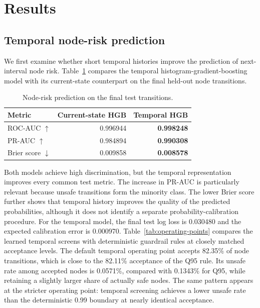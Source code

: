 \section{Results}
\label{sec:results}

\subsection{Temporal node-risk prediction}

We first examine whether short temporal histories improve the prediction
of next-interval node risk. Table~\ref{tab:model-quality} compares the
temporal histogram-gradient-boosting model with its current-state
counterpart on the final held-out node transitions.

\begin{table}[t]
\centering
\caption{Node-risk prediction on the final test transitions.}
\label{tab:model-quality}
\begin{tabular}{lrr}
\toprule
Metric &
Current-state HGB &
Temporal HGB \\
\midrule
ROC-AUC $\uparrow$ &
0.996944 &
\textbf{0.998248} \\

PR-AUC $\uparrow$ &
0.984894 &
\textbf{0.990308} \\

Brier score $\downarrow$ &
0.009858 &
\textbf{0.008578} \\
\bottomrule
\end{tabular}
\end{table}

Both models achieve high discrimination, but the temporal representation
improves every common test metric. The increase in PR-AUC is particularly
relevant because unsafe transitions form the minority class. The lower
Brier score further shows that temporal history improves the quality of
the predicted probabilities, although it does not identify a separate probability-calibration procedure.
For the temporal model, the final test log loss is 0.030480 and the
expected calibration error is 0.000970. Table~\ref{tab:operating-points} compares the learned temporal screens
with deterministic guardrail rules at closely matched acceptance levels.
The default temporal operating point accepts 82.35\% of node transitions,
which is close to the 82.11\% acceptance of the Q95 rule. Its unsafe rate
among accepted nodes is 0.0571\%, compared with 0.1343\% for Q95, while
retaining a slightly larger share of actually safe nodes. The same
pattern appears at the stricter operating point: temporal screening
achieves a lower unsafe rate than the deterministic 0.99 boundary at
nearly identical acceptance.

